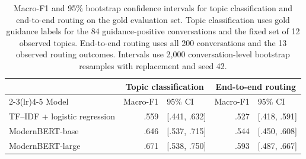 \begin{table}[H]
\centering
\small
\setlength{\tabcolsep}{5pt}
\begin{tabular}{lrlrl}
\toprule
& \multicolumn{2}{c}{Topic classification} & \multicolumn{2}{c}{End-to-end routing} \\
\cmidrule(lr){2-3}\cmidrule(lr){4-5}
Model & Macro-F1 & 95\% CI & Macro-F1 & 95\% CI \\
\midrule
TF--IDF + logistic regression & .559 & [.441, .632] & .527 & [.418, .591] \\
ModernBERT-base & .646 & [.537, .715] & .544 & [.450, .608] \\
ModernBERT-large & .671 & [.538, .750] & .593 & [.487, .667] \\
\bottomrule
\end{tabular}
\caption{Macro-F1 and 95\% bootstrap confidence intervals for topic classification and end-to-end routing on the gold evaluation set. Topic classification uses gold guidance labels for the 84 guidance-positive conversations and the fixed set of 12 observed topics. End-to-end routing uses all 200 conversations and the 13 observed routing outcomes. Intervals use 2,000 conversation-level bootstrap resamples with replacement and seed 42.}
\label{tab:supp-topic-cascade-ci}
\end{table}
